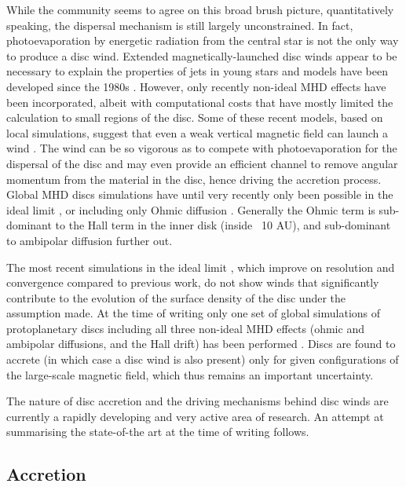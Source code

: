 \documentclass{rsos}
\begin{document}
While the community seems to agree on this broad brush picture, quantitatively speaking, the dispersal mechanism is still largely unconstrained. In fact, photoevaporation by energetic radiation from the central star is not the only way to produce a disc wind. Extended magnetically-launched disc winds appear to be necessary to explain the properties of jets in young stars 
\cite{2006A&A...453..785F} and models have been developed since the 1980s 
\cite{1982MNRAS.199..883B}. However, only recently non-ideal MHD effects have been incorporated, albeit with computational costs that have mostly limited the calculation to small regions of the disc. Some of these recent models, based on local simulations, suggest that even a weak vertical magnetic field can launch a wind 
\cite{2013ApJ...769...76B}. The wind can be so vigorous as to compete with photoevaporation for the dispersal of the disc and may even provide an efficient channel to remove angular momentum from the material in the disc, hence driving the accretion process. Global MHD discs simulations have until very recently only been possible in the ideal limit \cite{2014ApJ...784..121S,2015ApJ...801...84G}, or including only Ohmic diffusion \cite{2013ApJ...765..114D, 2017ApJ...835..230F}. Generally the Ohmic term is sub-dominant to the Hall term in the inner disk (inside ~10 AU), and sub-dominant to ambipolar diffusion further out. 

The most recent simulations in the ideal limit  \cite{2017arXiv170104627Z}, which improve on resolution and convergence compared to previous work, do not show winds that significantly contribute to the evolution of the surface density of the disc under the assumption made.
At the time of writing only one set of global simulations of protoplanetary discs including all three non-ideal MHD effects (ohmic and ambipolar diffusions, and the Hall drift) has been performed \cite{2016arXiv161200883B}. Discs are found to accrete (in which case a disc wind is also present) only for given configurations of the large-scale magnetic field, which thus remains an important uncertainty. 

The nature of disc accretion and the driving mechanisms behind disc winds are currently a rapidly developing and very active area of research. An attempt at summarising the state-of-the art at the time of writing follows. 

\subsection{Accretion} 
\end{document}
